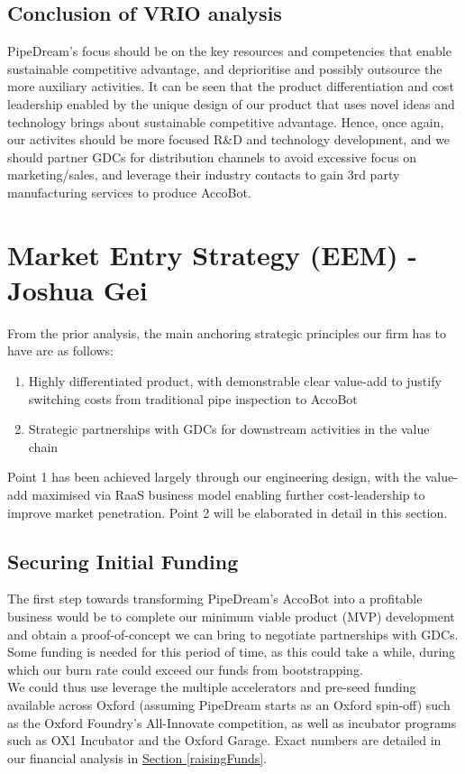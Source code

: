 \documentclass[11pt]{article}		%
\newcommand{\sectref}[1]{\hyperref[#1]{Section \ref*{#1}}}     %
\begin{document}
	\subsection{Conclusion of VRIO analysis}
	PipeDream's focus should be on the key resources and competencies that enable sustainable competitive advantage, and deprioritise and possibly outsource the more auxiliary activities. It can be seen that the product differentiation and cost leadership enabled by the unique design of our product that uses novel ideas and technology brings about sustainable competitive advantage. Hence, once again, our activites should be more focused R\&D and technology development, and we should partner GDCs for distribution channels to avoid excessive focus on marketing/sales, and leverage their industry contacts to gain 3rd party manufacturing services to produce AccoBot. 
	
	
	\section[Market Entry Strategy - EEM]{Market Entry Strategy (EEM) - Joshua Gei} \label{marketEntry}
	From the prior analysis, the main anchoring strategic principles our firm has to have are as follows: 
    \begin{enumerate}
    \item Highly differentiated product, with demonstrable clear value-add to justify switching costs from traditional pipe inspection to AccoBot
    \item Strategic partnerships with GDCs for downstream activities in the value chain
    \end{enumerate}
Point 1 has been achieved largely through our engineering design, with the value-add maximised via RaaS business model enabling further cost-leadership to improve market penetration. Point 2 will be elaborated in detail in this section.  

	\subsection{Securing Initial Funding}
	The first step towards transforming PipeDream’s AccoBot into a profitable business would be to complete our minimum viable product (MVP) development and obtain a proof-of-concept we can bring to negotiate partnerships with GDCs. Some funding is needed for this period of time, as this could take a while, during which our burn rate could exceed our funds from bootstrapping. 
    \\ \hspace*{3ex} We could thus use leverage the multiple accelerators and pre-seed funding available across Oxford (assuming PipeDream starts as an Oxford spin-off) such as the Oxford Foundry’s All-Innovate competition, as well as incubator programs such as OX1 Incubator and the Oxford Garage. Exact numbers are detailed in our financial analysis in \sectref{raisingFunds}. 
\end{document}
